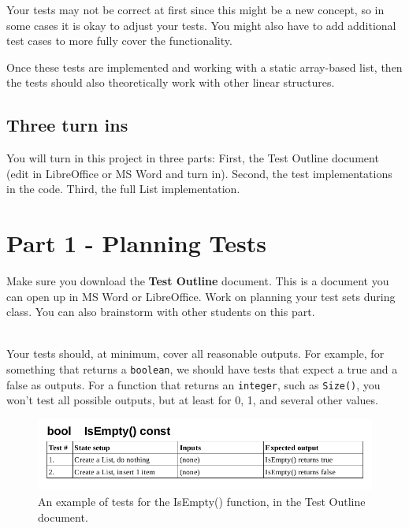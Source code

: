     Your tests may not be correct at first since this might be a new concept,
    so in some cases it is okay to adjust your tests. You might also have to
    add additional test cases to more fully cover the functionality.

    Once these tests are implemented and working with a static array-based
    list, then the tests should also theoretically work with other linear
    structures.

    \subsection{Three turn ins}

    You will turn in this project in three parts: First, the Test Outline
    document (edit in LibreOffice or MS Word and turn in). Second, the
    test implementations in the code. Third, the full List implementation.

    \newpage

    \section{Part 1 - Planning Tests}

    Make sure you download the \textbf{Test Outline} document. This is
    a document you can open up in MS Word or LibreOffice. Work on
    planning your test sets during class. You can also brainstorm
    with other students on this part.

    ~\\ Your tests should, at minimum, cover all reasonable outputs.
    For example, for something that returns a \texttt{boolean},
    we should have tests that expect a true and a false as outputs.
    For a function that returns an \texttt{integer}, such as \texttt{Size()},
    you won't test all possible outputs, but at least for 0, 1, and
    several other values.

    \begin{figure}[h]
        \centering
        \includegraphics[width=14cm]{images-2018-01/example-test.png}
        \caption{An example of tests for the IsEmpty() function, in the Test Outline document.}
    \end{figure}

